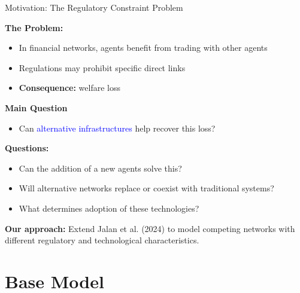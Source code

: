 \documentclass[aspectratio=169]{beamer}
\begin{document}
\begin{frame}{Motivation: The Regulatory Constraint Problem}
    
    \textbf{The Problem:}
    \begin{itemize}
        \item In financial networks, agents benefit from trading with other agents
        \item Regulations may prohibit specific direct links
        \item \textbf{Consequence:} welfare loss
    \end{itemize}
    
    \textbf{Main Question}
    \begin{itemize}
        \item Can \textcolor{blue}{alternative infrastructures} help recover this loss?
    \end{itemize}
    
    \textbf{Questions:}
    \begin{itemize}
        \item Can the addition of a new agents solve this?
        \item Will alternative networks replace or coexist with traditional systems?
        \item What determines adoption of these technologies?
    \end{itemize}

    \textbf{Our approach:} Extend Jalan et al. (2024) to model competing networks with different regulatory and technological characteristics.

\end{frame}

\section{Base Model}
\end{document}
